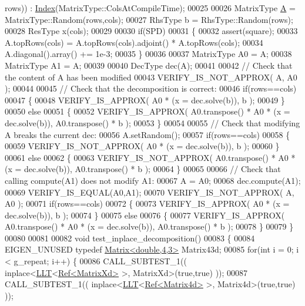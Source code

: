 \begin{DoxyCode}
      rows))    : \hyperlink{namespace_eigen_a62e77e0933482dafde8fe197d9a2cfde}{Index}(MatrixType::ColsAtCompileTime);
00025 
00026   MatrixType \hyperlink{group___core___module_class_eigen_1_1_matrix}{A} = MatrixType::Random(rows,cols);
00027   RhsType b = RhsType::Random(rows);
00028   ResType x(cols);
00029 
00030   \textcolor{keywordflow}{if}(SPD)
00031   \{
00032     assert(square);
00033     A.topRows(cols) = A.topRows(cols).adjoint() * A.topRows(cols);
00034     A.diagonal().array() += 1e-3;
00035   \}
00036 
00037   MatrixType A0 = A;
00038   MatrixType A1 = A;
00039 
00040   DecType dec(A);
00041 
00042   \textcolor{comment}{// Check that the content of A has been modified}
00043   VERIFY\_IS\_NOT\_APPROX( A, A0 );
00044 
00045   \textcolor{comment}{// Check that the decomposition is correct:}
00046   \textcolor{keywordflow}{if}(rows==cols)
00047   \{
00048     VERIFY\_IS\_APPROX( A0 * (x = dec.solve(b)), b );
00049   \}
00050   \textcolor{keywordflow}{else}
00051   \{
00052     VERIFY\_IS\_APPROX( A0.transpose() * A0 * (x = dec.solve(b)), A0.transpose() * b );
00053   \}
00054 
00055   \textcolor{comment}{// Check that modifying A breaks the current dec:}
00056   A.setRandom();
00057   \textcolor{keywordflow}{if}(rows==cols)
00058   \{
00059     VERIFY\_IS\_NOT\_APPROX( A0 * (x = dec.solve(b)), b );
00060   \}
00061   \textcolor{keywordflow}{else}
00062   \{
00063     VERIFY\_IS\_NOT\_APPROX( A0.transpose() * A0 * (x = dec.solve(b)), A0.transpose() * b );
00064   \}
00065 
00066   \textcolor{comment}{// Check that calling compute(A1) does not modify A1:}
00067   A = A0;
00068   dec.compute(A1);
00069   VERIFY\_IS\_EQUAL(A0,A1);
00070   VERIFY\_IS\_NOT\_APPROX( A, A0 );
00071   \textcolor{keywordflow}{if}(rows==cols)
00072   \{
00073     VERIFY\_IS\_APPROX( A0 * (x = dec.solve(b)), b );
00074   \}
00075   \textcolor{keywordflow}{else}
00076   \{
00077     VERIFY\_IS\_APPROX( A0.transpose() * A0 * (x = dec.solve(b)), A0.transpose() * b );
00078   \}
00079 \}
00080 
00081 
00082 \textcolor{keywordtype}{void} test\_inplace\_decomposition()
00083 \{
00084   EIGEN\_UNUSED \textcolor{keyword}{typedef} \hyperlink{group___core___module_class_eigen_1_1_matrix}{Matrix<double,4,3>} Matrix43d;
00085   \textcolor{keywordflow}{for}(\textcolor{keywordtype}{int} i = 0; i < g\_repeat; i++) \{
00086     CALL\_SUBTEST\_1(( inplace<\hyperlink{group___cholesky___module_class_eigen_1_1_l_l_t}{LLT}<\hyperlink{group___core___module_class_eigen_1_1_ref}{Ref<MatrixXd>} >, MatrixXd>(\textcolor{keyword}{true},\textcolor{keyword}{true}) ));
00087     CALL\_SUBTEST\_1(( inplace<\hyperlink{group___cholesky___module_class_eigen_1_1_l_l_t}{LLT}<\hyperlink{group___core___module_class_eigen_1_1_ref}{Ref<Matrix4d>} >, Matrix4d>(\textcolor{keyword}{true},\textcolor{keyword}{true}) ));

\end{DoxyCode}
